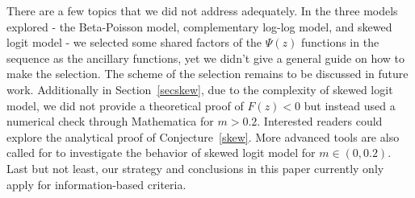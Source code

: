 \documentclass[12pt]{amsart}
\theoremstyle{definition}
\theoremstyle{remark}
\numberwithin{equation}{section}
\begin{document}
 
 
 
There are a few topics that we did not address adequately. In the three models explored - the Beta-Poisson model, complementary log-log model, and skewed logit model - we selected some shared factors of the $\Psi(z)$ functions in the sequence as the ancillary functions, yet we didn't give a general guide on how to make the selection. The scheme of the selection remains to be discussed in future work. Additionally in Section~\ref{secskew}, due to the complexity of skewed logit model, we did not provide a theoretical proof of $F(z)<0$ but instead used a numerical check through Mathematica for $m>0.2$. Interested readers could explore the analytical proof of Conjecture~\ref{skew}. More advanced tools are also called for to investigate the behavior of skewed logit model for $m\in (0,0.2)$. Last but not least, our strategy and conclusions in this paper currently only apply for information-based criteria. 







 
 
 


 
\nocite{*}
%

% 
 
\end{document}
